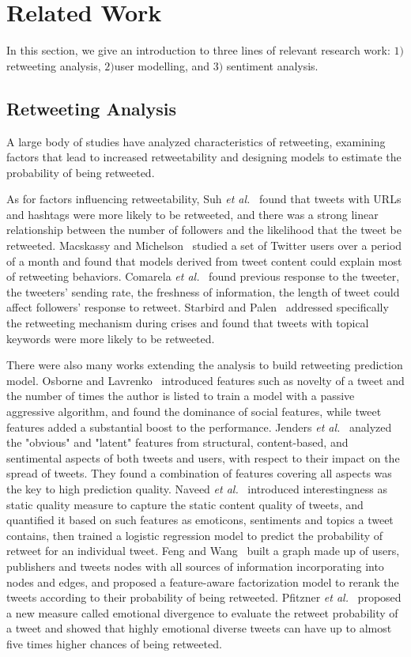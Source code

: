 \documentclass{acm_proc_article-sp}
\begin{document}
\section{Related Work}
\label{relatedwork}
In this section, we give an introduction to three lines of relevant research work: $ 1) $ retweeting analysis, $ 2) $user modelling, and $  3)$ sentiment analysis. 
\subsection{Retweeting Analysis}
A large body of studies have analyzed characteristics of retweeting, examining factors that lead to increased retweetability and designing models to estimate the probability of being retweeted. 

As for factors influencing retweetability, Suh \emph{et al.}~\cite{suh2010want} found that tweets with URLs and hashtags were more likely to be retweeted, and there was a strong linear relationship between the number of followers and the likelihood that the tweet be retweeted. 
Macskassy and Michelson~\cite{macskassy2011people} studied a set of Twitter users over a period of a month and found that models derived from tweet content could explain most of retweeting behaviors.
Comarela \emph{et al.}~\cite{comarela2012understanding} found previous response to the tweeter, the tweeters’ sending rate, the freshness of information, the length of tweet could affect followers’ response to retweet. 
Starbird and Palen~\cite{starbird2012will} addressed specifically the retweeting mechanism during crises and found that tweets with topical keywords were more likely to be retweeted. 

There were also many works extending the analysis to build retweeting prediction model. 
Osborne and Lavrenko~\cite{petrovic2011rt} introduced features such as novelty of a tweet and the number of times the author is listed to train a model with a passive aggressive algorithm, and found the dominance of social features, while tweet features added a substantial boost to the performance.
Jenders \emph{et al.}~\cite{jenders2013analyzing} analyzed the "obvious" and "latent" features from structural, content-based, and sentimental aspects of both tweets and users, with respect to their impact on the spread of tweets. 
They found a combination of features covering all aspects was the key to high prediction quality.
Naveed \emph{et al.}~\cite{naveed2011searching,naveed2011bad} introduced interestingness as static quality measure to capture the static content quality of tweets, and quantified it based on such features as emoticons, sentiments and topics a tweet contains, then trained a logistic regression model to predict the probability of retweet for an individual tweet.
Feng and Wang~\cite{feng2013retweet} built a graph made up of users, publishers and tweets nodes with all sources of information incorporating into nodes and edges, and proposed a feature-aware factorization model to rerank the tweets according to their probability of being retweeted.
Pfitzner \emph{et al.}~\cite{pfitzner2012emotional} proposed a new measure called emotional divergence to evaluate the retweet probability of a tweet and showed that highly emotional diverse tweets can have up to almost five times higher chances of being retweeted.
\end{document}
